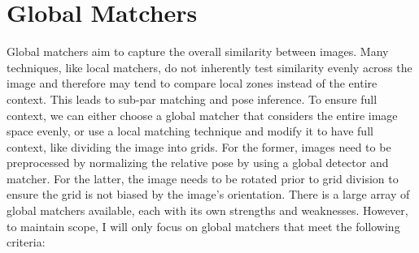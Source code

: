 

\section*{Global Matchers}

Global matchers aim to capture the overall similarity between images. Many techniques, like local matchers, do not inherently test similarity evenly across the image and therefore may tend to compare local zones instead of the entire context. This leads to sub-par matching and pose inference. 
To ensure full context, we can either choose a global matcher that considers the entire image space evenly, or use a local matching technique and modify it to have full context, like dividing the image into grids. For the former, images need to be preprocessed by normalizing the relative pose by using a global detector and matcher. For the latter, the image needs to be rotated prior to grid division to ensure the grid is not biased by the image's orientation.
There is a large array of global matchers available, each with its own strengths and weaknesses. However, to maintain scope, I will only focus on global matchers that meet the following criteria:
